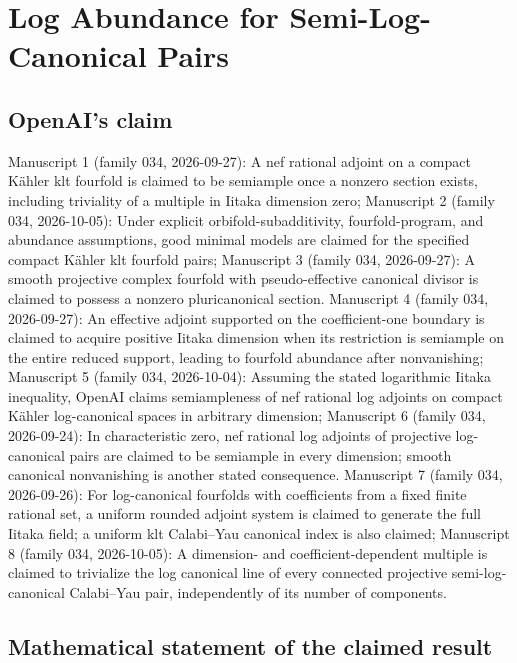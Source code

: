 \documentclass[11pt]{article}
\begin{document}
\section*{Log Abundance for Semi-Log-Canonical Pairs}

\subsection{OpenAI's claim}
Manuscript 1 (family 034, 2026-09-27): A nef rational adjoint on a compact Kähler klt fourfold is claimed to be semiample once a nonzero section exists, including triviality of a multiple in Iitaka dimension zero; Manuscript 2 (family 034, 2026-10-05): Under explicit orbifold-subadditivity, fourfold-program, and abundance assumptions, good minimal models are claimed for the specified compact Kähler klt fourfold pairs; Manuscript 3 (family 034, 2026-09-27): A smooth projective complex fourfold with pseudo-effective canonical divisor is claimed to possess a nonzero pluricanonical section. Manuscript 4 (family 034, 2026-09-27): An effective adjoint supported on the coefficient-one boundary is claimed to acquire positive Iitaka dimension when its restriction is semiample on the entire reduced support, leading to fourfold abundance after nonvanishing; Manuscript 5 (family 034, 2026-10-04): Assuming the stated logarithmic Iitaka inequality, OpenAI claims semiampleness of nef rational log adjoints on compact Kähler log-canonical spaces in arbitrary dimension; Manuscript 6 (family 034, 2026-09-24): In characteristic zero, nef rational log adjoints of projective log-canonical pairs are claimed to be semiample in every dimension; smooth canonical nonvanishing is another stated consequence. Manuscript 7 (family 034, 2026-09-26): For log-canonical fourfolds with coefficients from a fixed finite rational set, a uniform rounded adjoint system is claimed to generate the full Iitaka field; a uniform klt Calabi--Yau canonical index is also claimed; Manuscript 8 (family 034, 2026-10-05): A dimension- and coefficient-dependent multiple is claimed to trivialize the log canonical line of every connected projective semi-log-canonical Calabi--Yau pair, independently of its number of components.

\subsection{Mathematical statement of the claimed result}
\end{document}
